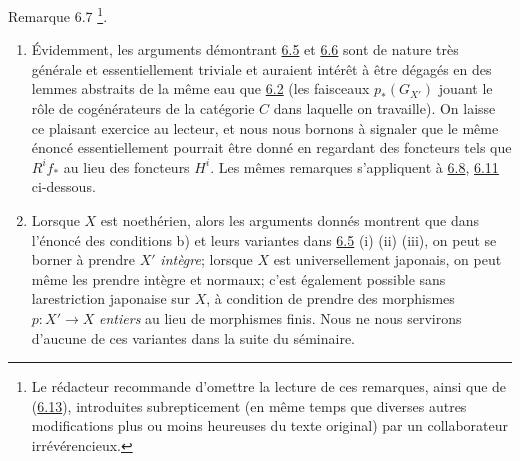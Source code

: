 \documentclass[10pt]{../fichiers-configuration-latex/smfart}
\begin{document}
\begin{enonce*}[remark]{Remarque 6.7}
\footnote{Le rédacteur recommande d'omettre la lecture de ces
remarques, ainsi que de (\hyperref[XII.rems6.13]{6.13}), introduites subrepticement (en même
temps que diverses autres modifications plus ou moins heureuses du
texte original) par un collaborateur irrévérencieux.}.
\begin{enumerate}
\renewcommand{\labelenumi}{\theenumi)}
\item Évidemment, les arguments démontrant \hyperref[XII.prop6.5]{6.5} et
  \hyperref[XII.cor6.6]{6.6} sont de nature 
très générale et essentiellement triviale et auraient intérêt à être
dégagés en des lemmes abstraits de la même eau que \hyperref[XII.lem6.2]{6.2}
(les faisceaux 
$p_{\ast}(G_{X'})$ jouant le rôle de cogénérateurs de la catégorie $C$
dans laquelle on travaille). On laisse ce plaisant exercice au
lecteur, et nous nous bornons à signaler que le même énoncé
essentiellement pourrait être donné en regardant des foncteurs tels
que $R^{i}f_{\ast}$ au lieu des foncteurs $H^{i}$. Les mêmes remarques
s'appliquent à \hyperref[XII.prop6.8]{6.8}, \hyperref[XII.prop6.11]{6.11} ci-dessous.

\item Lorsque $X$ est noethérien, alors les arguments donnés montrent
que dans l'énoncé des conditions b) et leurs variantes dans \hyperref[XII.prop6.5]{6.5} (i)
(ii) (iii), on peut se borner à prendre $X'$ \emph{intègre}; lorsque
$X$ est universellement japonais, on peut même les prendre intègre et
normaux; c'est également possible sans la\pageoriginale restriction
japonaise sur $X$, à condition de prendre des morphismes $p:X'\rightarrow X$
\emph{entiers} au lieu de morphismes finis. Nous ne nous servirons
d'aucune de ces variantes dans la suite du séminaire.


\end{enumerate}
\end{enonce*}
\end{document}
